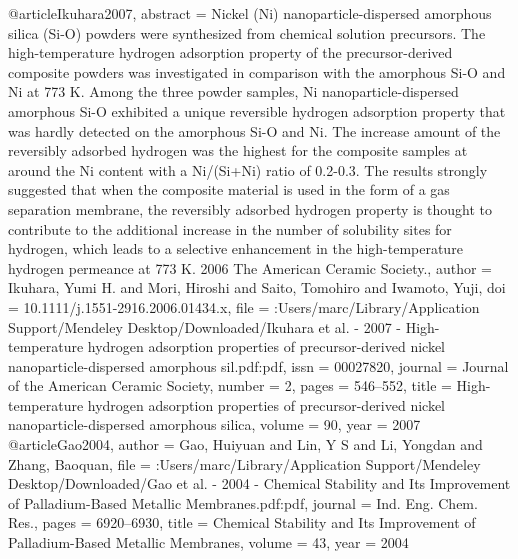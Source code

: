 @article{Ikuhara2007,
abstract = {Nickel (Ni) nanoparticle-dispersed amorphous silica (Si-O) powders were synthesized from chemical solution precursors. The high-temperature hydrogen adsorption property of the precursor-derived composite powders was investigated in comparison with the amorphous Si-O and Ni at 773 K. Among the three powder samples, Ni nanoparticle-dispersed amorphous Si-O exhibited a unique reversible hydrogen adsorption property that was hardly detected on the amorphous Si-O and Ni. The increase amount of the reversibly adsorbed hydrogen was the highest for the composite samples at around the Ni content with a Ni/(Si+Ni) ratio of 0.2-0.3. The results strongly suggested that when the composite material is used in the form of a gas separation membrane, the reversibly adsorbed hydrogen property is thought to contribute to the additional increase in the number of solubility sites for hydrogen, which leads to a selective enhancement in the high-temperature hydrogen permeance at 773 K. {\textcopyright} 2006 The American Ceramic Society.},
author = {Ikuhara, Yumi H. and Mori, Hiroshi and Saito, Tomohiro and Iwamoto, Yuji},
doi = {10.1111/j.1551-2916.2006.01434.x},
file = {:Users/marc/Library/Application Support/Mendeley Desktop/Downloaded/Ikuhara et al. - 2007 - High-temperature hydrogen adsorption properties of precursor-derived nickel nanoparticle-dispersed amorphous sil.pdf:pdf},
issn = {00027820},
journal = {Journal of the American Ceramic Society},
number = {2},
pages = {546--552},
title = {{High-temperature hydrogen adsorption properties of precursor-derived nickel nanoparticle-dispersed amorphous silica}},
volume = {90},
year = {2007}
}
@article{Gao2004,
author = {Gao, Huiyuan and Lin, Y S and Li, Yongdan and Zhang, Baoquan},
file = {:Users/marc/Library/Application Support/Mendeley Desktop/Downloaded/Gao et al. - 2004 - Chemical Stability and Its Improvement of Palladium-Based Metallic Membranes.pdf:pdf},
journal = {Ind. Eng. Chem. Res.},
pages = {6920--6930},
title = {{Chemical Stability and Its Improvement of Palladium-Based Metallic Membranes}},
volume = {43},
year = {2004}
}
